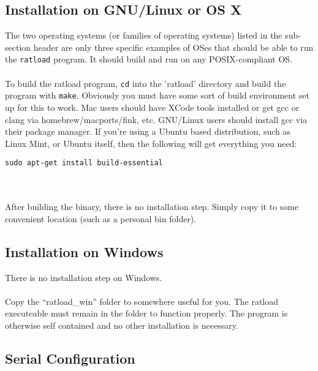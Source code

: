 \documentclass[notitlepage]{article}
\begin{document}
\subsection{Installation on GNU/Linux or OS X}
The two operating systems (or families of operating systems) listed in the sub-section header are only three specific examples of OSes that should be able to run the \texttt{ratload} program. It should build and run on any POSIX-compliant OS.\\\\
To build the ratload program, \texttt{cd} into the 'ratload' directory and build the program with \texttt{make}. Obviously you must have some sort of build environment set up for this to work. Mac users should have XCode tools installed or get gcc or clang via homebrew/macports/fink, etc. GNU/Linux users should install gcc via their package manager. If you're using a Ubuntu based distribution, such as Linux Mint, or Ubuntu itself, then the following will get everything you need:\\
\centerline{\texttt{sudo apt-get install build-essential}}\\\\
After building the binary, there is no installation step. Simply copy it to some convenient location (such as a personal bin folder).

\subsection{Installation on Windows}
There is no installation step on Windows.\\\\
Copy the ``ratload\_win'' folder to somewhere useful for you. The ratload executeable must remain in the folder to function properly. The program is otherwise self contained and no other installation is necessary.


\subsection{Serial Configuration}
\end{document}
